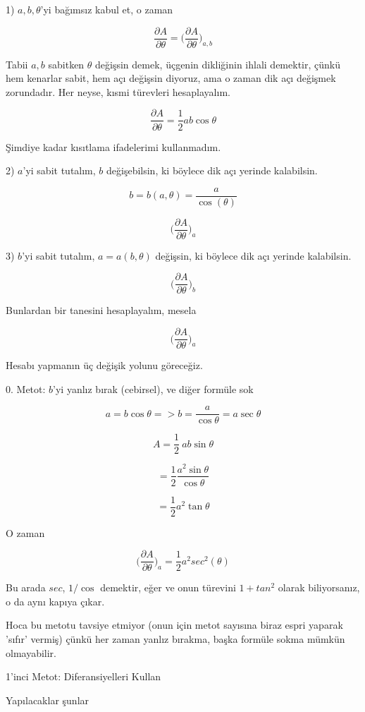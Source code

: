 \documentclass[12pt,fleqn]{article}\usepackage{../../common}
\begin{document}
1) $a,b,\theta$'yi bağımsız kabul et, o zaman

$$
\frac{\partial A}{\partial \theta} = 
\bigg( \frac{\partial A}{\partial \theta} \bigg)_{a,b}
$$

Tabii $a,b$ sabitken $\theta$ değişsin demek, üçgenin dikliğinin ihlali
demektir, çünkü hem kenarlar sabit, hem açı değişsin diyoruz, ama o zaman
dik açı değişmek zorundadır. Her neyse, kısmi türevleri hesaplayalım. 

$$
\frac{\partial A}{\partial \theta} = \frac{1}{2}ab \cos\theta
$$

Şimdiye kadar kısıtlama ifadelerimi kullanmadım. 

2) $a$'yi sabit tutalım, $b$ değişebilsin, ki böylece dik açı yerinde
kalabilsin. 

$$
b = b(a,\theta) = \frac{a}{\cos(\theta)}
$$

$$
\bigg( \frac{\partial A}{\partial \theta} \bigg)_{a}
$$

3) $b$'yi sabit tutalım, $a = a(b,\theta)$ değişsin, ki böylece dik açı yerinde
kalabilsin. 

$$\bigg( \frac{\partial A}{\partial \theta} \bigg)_{b}$$

Bunlardan bir tanesini hesaplayalım, mesela

$$\bigg( \frac{ \partial A}{\partial \theta } \bigg)_{a} $$

Hesabı yapmanın üç değişik yolunu göreceğiz. 

0. Metot: $b$'yi yanlız bırak (cebirsel), ve diğer formüle sok

$$ a = b \cos \theta => b = \frac{a}{\cos\theta} = a \sec\theta$$

$$ A = \frac{1}{2} \ ab \sin\theta $$

$$ = \frac{1}{2} \frac{a^2 \sin \theta}{\cos \theta} $$

$$ = \frac{1}{2} a^2 \tan \theta $$

O zaman 

$$ \bigg( \frac{\partial A}{\partial \theta} \bigg)_{a} = 
\frac{1}{2}a^2sec^2(\theta)
$$

Bu arada $sec$, $1/\cos$ demektir, eğer ve onun türevini $1+tan^2$ olarak
biliyorsanız, o da aynı kapıya çıkar. 

Hoca bu metotu tavsiye etmiyor (onun için metot sayısına biraz espri yaparak
'sıfır' vermiş) çünkü her zaman yanlız bırakma, başka formüle sokma mümkün
olmayabilir.

1'inci Metot: Diferansiyelleri Kullan

Yapılacaklar şunlar
\end{document}
